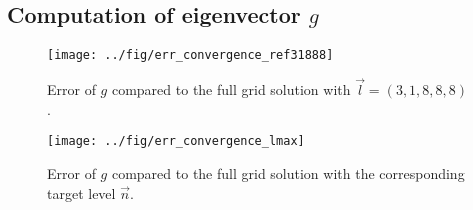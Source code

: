 \documentclass{scrartcl}
\begin{document}
\subsection*{Computation of eigenvector $g$}

\begin{figure}[h]
	\centering
	\texttt{[image: ../fig/err\_convergence\_ref31888]}
	\caption{Error of $g$ compared to the full grid solution with $\vec{l} = (3,1,8,8,8)$. }
	\label{fig:err_convergence_ref31888}
\end{figure}

\begin{figure}[h]
	\centering
	\texttt{[image: ../fig/err\_convergence\_lmax]}
	\caption{Error of $g$ compared to the full grid solution with the corresponding target level $\vec{n}$. }
	\label{fig:err_convergence_lmax}
\end{figure}
\end{document}
